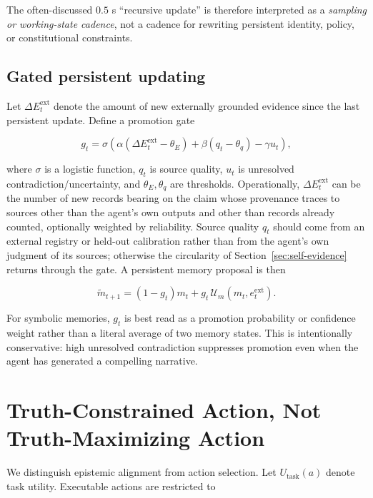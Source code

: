 \documentclass[11pt]{article}
\newcommand{\Update}{\mathcal{U}}
\begin{document}
The often-discussed $0.5$ s ``recursive update'' is therefore interpreted as a \emph{sampling or working-state cadence}, not a cadence for rewriting persistent identity, policy, or constitutional constraints.

\subsection{Gated persistent updating}

Let $\Delta E_t^{\mathrm{ext}}$ denote the amount of new externally grounded evidence since the last persistent update. Define a promotion gate

\begin{equation}
    g_t = \sigma\left(\alpha(\Delta E_t^{\mathrm{ext}}-\theta_E)
    +\beta(q_t-\theta_q)
    -\gamma u_t\right),
\end{equation}

where $\sigma$ is a logistic function, $q_t$ is source quality, $u_t$ is unresolved contradiction/uncertainty, and $\theta_E,\theta_q$ are thresholds. Operationally, $\Delta E_t^{\mathrm{ext}}$ can be the number of new records bearing on the claim whose provenance traces to sources other than the agent's own outputs and other than records already counted, optionally weighted by reliability. Source quality $q_t$ should come from an external registry or held-out calibration rather than from the agent's own judgment of its sources; otherwise the circularity of Section~\ref{sec:self-evidence} returns through the gate. A persistent memory proposal is then

\begin{equation}
    \tilde{m}_{t+1} = (1-g_t)m_t + g_t\,\Update_m(m_t,e_t^{\mathrm{ext}}).
\end{equation}

For symbolic memories, $g_t$ is best read as a promotion probability or confidence weight rather than a literal average of two memory states. This is intentionally conservative: high unresolved contradiction suppresses promotion even when the agent has generated a compelling narrative.

\section{Truth-Constrained Action, Not Truth-Maximizing Action}
\label{sec:constrained-action}

We distinguish epistemic alignment from action selection. Let $U_{\mathrm{task}}(a)$ denote task utility. Executable actions are restricted to
\end{document}
